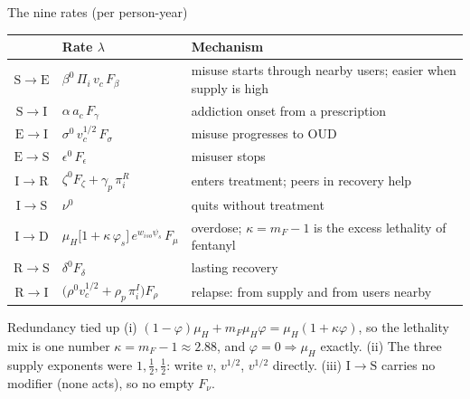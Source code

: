 ﻿\documentclass[9pt,aspectratio=169]{beamer}
\newenvironment{tied}{\begin{alertblock}{Redundancy tied up}\small}{\end{alertblock}}
\newcommand{\Sc}{\mathrm{S}}\newcommand{\Ec}{\mathrm{E}}\newcommand{\Ic}{\mathrm{I}}\newcommand{\Rc}{\mathrm{R}}\newcommand{\Dc}{\mathrm{D}}
\begin{document}
\begin{frame}{The nine rates (per person-year)}
 \renewcommand{\arraystretch}{1.28}
 \footnotesize
 \begin{tabularx}{\textwidth}{@{}c l X@{}}
 \toprule
 & Rate $\lambda$ & Mechanism\\\midrule
 $\Sc\!\to\!\Ec$ & $\beta^0\,\Pi_i\,v_c\,F_\beta$ & misuse starts through nearby users; easier when supply is high\\
 $\Sc\!\to\!\Ic$ & $\alpha\,a_c\,F_\gamma$ & addiction onset from a prescription\\
 $\Ec\!\to\!\Ic$ & $\sigma^0\,v_c^{1/2}\,F_\sigma$ & misuse progresses to OUD\\
 $\Ec\!\to\!\Sc$ & $\epsilon^0\,F_\epsilon$ & misuser stops\\
 $\Ic\!\to\!\Rc$ & $\zeta^0F_\zeta+\gamma_p\,\pi^R_i$ & enters treatment; peers in recovery help\\
 $\Ic\!\to\!\Sc$ & $\nu^0$ & quits without treatment\\
 $\Ic\!\to\!\Dc$ & $\mu_H\big[1+\kappa\,\varphi_s\big]\,e^{w_{iso}\psi_s}\,F_\mu$ & overdose; $\kappa=m_F-1$ is the excess lethality of fentanyl\\
 $\Rc\!\to\!\Sc$ & $\delta^0F_\delta$ & lasting recovery\\
 $\Rc\!\to\!\Ic$ & $\big(\rho^0v_c^{1/2}+\rho_p\,\pi^I_i\big)F_\rho$ & relapse: from supply and from users nearby\\
 \bottomrule
 \end{tabularx}
 \vspace{4pt}
 \begin{tied}
  (i) $(1-\varphi)\mu_H+m_F\mu_H\varphi=\mu_H(1+\kappa\varphi)$, so the lethality mix is one number $\kappa=m_F-1\approx2.88$, and $\varphi=0\Rightarrow\mu_H$ exactly.
  (ii) The three supply exponents were $1,\tfrac12,\tfrac12$: write $v$, $v^{1/2}$, $v^{1/2}$ directly.
  (iii) $\Ic\!\to\!\Sc$ carries no modifier (none acts), so no empty $F_\nu$.
 \end{tied}
\end{frame}
\end{document}
